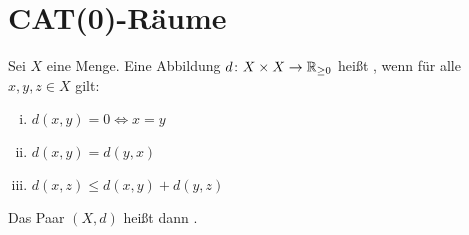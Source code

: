 \chapter{CAT(0)-Räume} %
\label{cha:1}

\begin{definition}
	Sei $X$ eine Menge. Eine Abbildung $d \colon X \times X \rightarrow \mathbb{R}_{\geq 0}$ heißt , wenn für alle $x,y,z \in X$ gilt:
	\begin{enumerate}[(i)]
		\item $d(x,y) = 0 \Leftrightarrow x=y$
		\item $d(x,y) = d(y,x)$
		\item $d(x,z) \leq d(x,y) + d(y,z)$
	\end{enumerate}
	Das Paar $(X,d)$ heißt dann .
\end{definition}

\cleardoubleoddemptypage
